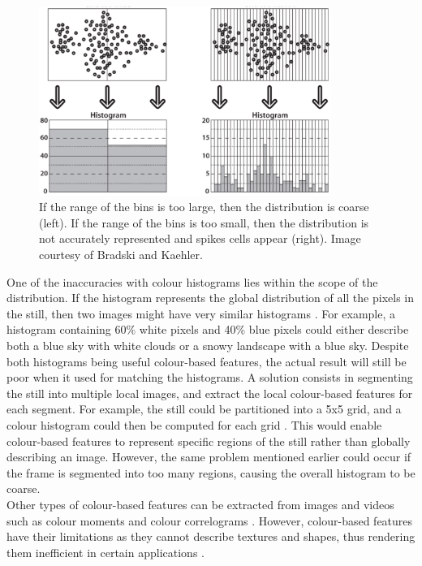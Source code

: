 \begin{figure}[h]
\centerline{\includegraphics[width=0.85\textwidth]{figures/litsurvey/histogram_bin_size.png}}
\caption{\label{fig:histogram-bin-size}If the range of the bins is too large, then the distribution is coarse (left). If the range of the bins is too small, then the distribution is not accurately represented and spikes cells appear (right). Image courtesy of Bradski and Kaehler.}
\end{figure}

One of the inaccuracies with colour histograms lies within the scope of the distribution. If the histogram represents the global distribution of all the pixels in the still, then two images might have very similar histograms \cite{petkovic2000}. For example, a histogram containing 60\% white pixels and 40\% blue pixels could either describe both a blue sky with white clouds or a snowy landscape with a blue sky. Despite both histograms being useful colour-based features, the actual result will still be poor when it used for matching the histograms. A solution consists in segmenting the still into multiple local images, and extract the local colour-based features for each segment. For example, the still could be partitioned into a 5x5 grid, and a colour histogram could then be computed for each grid \cite{yan2007review}. This would enable colour-based features to represent specific regions of the still rather than globally describing an image. However, the same problem mentioned earlier could occur if the frame is segmented into too many regions, causing the overall histogram to be coarse.\\

Other types of colour-based features can be extracted from images and videos such as colour moments and colour correlograms \cite{huang1997correlograms}. However, colour-based features have their limitations as they cannot describe textures and shapes, thus rendering them inefficient in certain applications \cite{hu2011survey}.

